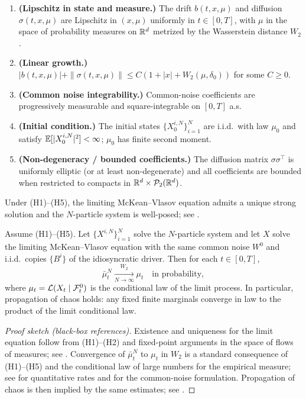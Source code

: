 \begin{enumerate}[label=(H\arabic*),ref=(H\arabic*)]
\item \textbf{(Lipschitz in state and measure.)}
The drift $b(t,x,\mu)$ and diffusion $\sigma(t,x,\mu)$ are Lipschitz in $(x,\mu)$ uniformly in $t\in[0,T]$, with $\mu$ in the space of probability measures on $\mathbb{R}^d$ metrized by the Wasserstein distance $W_2$.

\item \textbf{(Linear growth.)}
$|b(t,x,\mu)| + \|\sigma(t,x,\mu)\| \le C(1+|x| + W_2(\mu,\delta_0))$ for some $C\ge 0$.

\item \textbf{(Common noise integrability.)}
Common-noise coefficients are progressively measurable and square-integrable on $[0,T]$ a.s.

\item \textbf{(Initial condition.)}
The initial states $\{X^{i,N}_0\}_{i=1}^N$ are i.i.d.\ with law $\mu_0$ and satisfy $\mathbb{E}[|X^{i,N}_0|^2]<\infty$; $\mu_0$ has finite second moment.

\item \textbf{(Non-degeneracy / bounded coefficients.)}
The diffusion matrix $\sigma\sigma^\top$ is uniformly elliptic (or at least non-degenerate) and all coefficients are bounded when restricted to compacts in $\mathbb{R}^d\times \mathcal{P}_2(\mathbb{R}^d)$.
\end{enumerate}

Under (H1)--(H5), the limiting McKean--Vlasov equation admits a unique strong solution and the $N$-particle system is well-posed; see \cite{CarmonaDelarueMFGVol1,CarmonaDelarueMFGVol2}.

\begin{theorem}\label{thm:mfg_limit_conv}\label{thm:MFG_fixed_point}
Assume (H1)--(H5). Let $\{X^{i,N}\}_{i=1}^N$ solve the $N$-particle system and let $X$ solve the limiting McKean--Vlasov equation with the same common noise $W^0$ and i.i.d.\ copies $\{B^i\}$ of the idiosyncratic driver. Then for each $t\in[0,T]$,
\[
\bar\mu^N_t \xrightarrow[N\to\infty]{W_2} \mu_t \quad \text{in probability},
\]
where $\mu_t = \mathcal{L}(X_t\mid \mathcal{F}^0_t)$ is the conditional law of the limit process. In particular, propagation of chaos holds: any fixed finite marginals converge in law to the product of the limit conditional law.
\end{theorem}

\begin{proof}[Proof sketch (black-box references)]
Existence and uniqueness for the limit equation follow from (H1)--(H2) and fixed-point arguments in the space of flows of measures; see \cite{CarmonaDelarueMFGVol1}. Convergence of $\bar\mu^N_t$ to $\mu_t$ in $W_2$ is a standard consequence of (H1)--(H5) and the conditional law of large numbers for the empirical measure; see \cite{FournierGuillin2015} for quantitative rates and \cite{Lacker2018} for the common-noise formulation. Propagation of chaos is then implied by the same estimates; see \cite{CarmonaDelarueMFGVol2}.
\end{proof}

